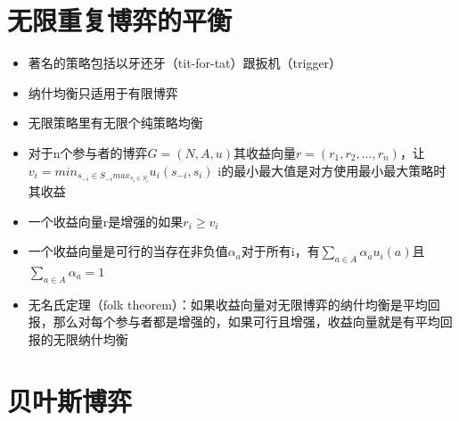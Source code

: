 \documentclass[]{book}
\providecommand{\tightlist}{%
  \setlength{\itemsep}{0pt}\setlength{\parskip}{0pt}}
\begin{document}
\hypertarget{ux65e0ux9650ux91cdux590dux535aux5f08ux7684ux5e73ux8861}{%
\section{无限重复博弈的平衡}\label{ux65e0ux9650ux91cdux590dux535aux5f08ux7684ux5e73ux8861}}

\begin{itemize}
\tightlist
\item
  著名的策略包括以牙还牙（tit-for-tat）跟扳机（trigger）
\item
  纳什均衡只适用于有限博弈
\item
  无限策略里有无限个纯策略均衡
\item
  对于n个参与者的博弈\(G = (N,A,u)\)其收益向量\(r = (r_1,r_2,...,r_n)\)，让\(v_i = min_{s_{-i} \in S_{-i}max_{s_i \in S_i}} u_i(s_{-i},s_i)\) i的最小最大值是对方使用最小最大策略时其收益
\item
  一个收益向量r是增强的如果\(r_i\geq v_i\)
\item
  一个收益向量是可行的当存在非负值\(\alpha_a\)对于所有i，有\(\sum_{a\in A}\alpha_au_i(a)\)且\(\sum_{a\in A}\alpha_a = 1\)
\item
  无名氏定理（folk theorem）：如果收益向量对无限博弈的纳什均衡是平均回报，那么对每个参与者都是增强的，如果可行且增强，收益向量就是有平均回报的无限纳什均衡
\end{itemize}

\hypertarget{ux8d1dux53f6ux65afux535aux5f08}{%
\section{贝叶斯博弈}\label{ux8d1dux53f6ux65afux535aux5f08}}
\end{document}
